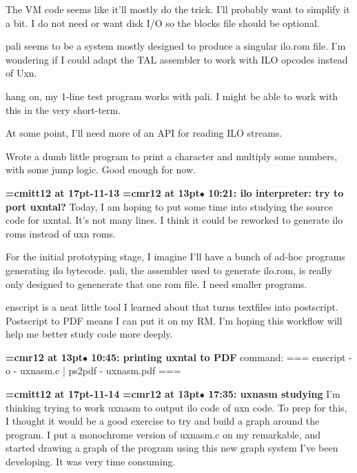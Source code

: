 The VM code seems like it'll mostly do the trick. I'll probably want to simplify it a bit. I do not need or want disk I/O so the blocks file should be optional.
\par

pali seems to be a system mostly designed to produce a singular ilo.rom file. I'm wondering if I could adapt the TAL assembler to work with ILO opcodes instead of Uxn.
\par

hang on, my 1-line test program works with pali. I might be able to work with this in the very short-term.
\par

At some point, I'll need more of an API for reading ILO streams.
\par

Wrote a dumb little program to print a character and multiply some numbers, with some jump logic. Good enough for now.
\par

{\medskip\noindent\bf\font\titlefont=cmitt12 at 17pt-11-13}\medskip
{\smallskip\noindent\bf\font\titlefont=cmr12 at 13pt\titlefont $\bullet$ 10:21: ilo interpreter: try to port uxntal?}\smallskip
Today, I am hoping to put some time into studying the source code for uxntal. It's not many lines. I think it could be reworked to generate ilo roms instead of uxn roms.
\par

For the initial prototyping stage, I imagine I'll have a bunch of ad-hoc programs generating ilo bytecode. pali, the assembler used to generate ilo.rom, is really only designed to genenerate that one rom file. I need smaller programs.
\par

enscript is a neat little tool I learned about that turns textfiles into postscript. Postscript to PDF means I can put it on my RM. I'm hoping this workflow will help me better study code more deeply.
\par

{\smallskip\noindent\bf\font\titlefont=cmr12 at 13pt\titlefont $\bullet$ 10:45: printing uxntal to PDF}\smallskip
command: === enscript -o - uxnasm.c | ps2pdf - uxnasm.pdf ===
\par

{\medskip\noindent\bf\font\titlefont=cmitt12 at 17pt-11-14}\medskip
{\smallskip\noindent\bf\font\titlefont=cmr12 at 13pt\titlefont $\bullet$ 17:35: uxnasm studying}\smallskip
I'm thinking trying to work uxnasm to output ilo code of uxn code. To prep for this, I thought it would be a good exercise to try and build a graph around the program. I put a monochrome version of uxnasm.c on my remarkable, and started drawing a graph of the program using this new graph system I've been developing. It was very time consuming.
\par

